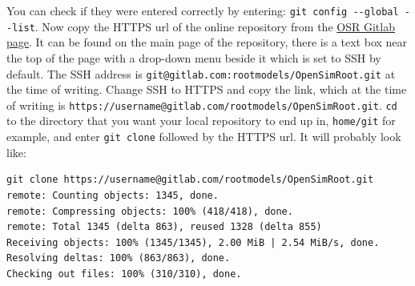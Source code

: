 \documentclass{article}
\begin{document}
\noindent You can check if they were entered correctly by entering: \verb|git config --global --list|. Now copy the HTTPS url of the online repository from the \href{https://gitlab.com/rootmodels/OpenSimRoot}{OSR Gitlab page}. It can be found on the main page of the repository, there is a text box near the top of the page with a drop-down menu beside it which is set to SSH by default. The SSH address is \verb|git@gitlab.com:rootmodels/OpenSimRoot.git| at the time of writing. Change SSH to HTTPS and copy the link, which at the time of writing is \verb|https://username@gitlab.com/rootmodels/OpenSimRoot.git|. \verb|cd| to the directory that you want your local repository to end up in, \verb|home/git| for example, and enter \verb|git clone| followed by the HTTPS url. It will probably look like:
\begin{verbatim}
git clone https://username@gitlab.com/rootmodels/OpenSimRoot.git
remote: Counting objects: 1345, done.
remote: Compressing objects: 100% (418/418), done.
remote: Total 1345 (delta 863), reused 1328 (delta 855)
Receiving objects: 100% (1345/1345), 2.00 MiB | 2.54 MiB/s, done.
Resolving deltas: 100% (863/863), done.
Checking out files: 100% (310/310), done.
\end{verbatim}
%
%
%
\end{document}

